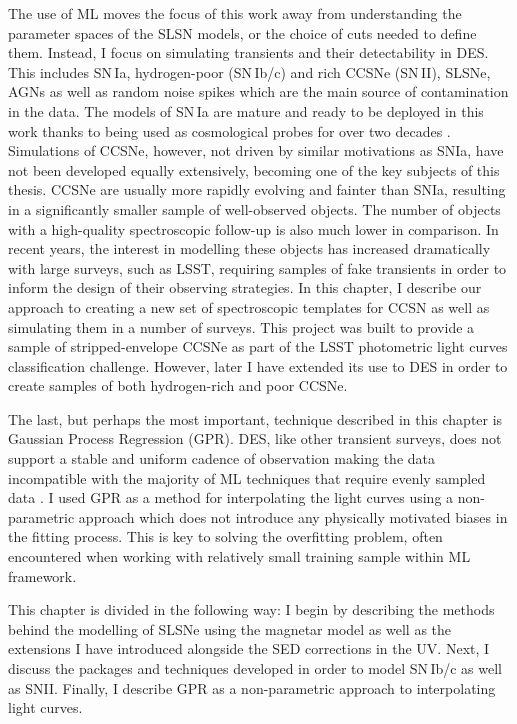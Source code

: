 The use of ML moves the focus of this work away from understanding the parameter spaces of the SLSN models, or the choice of cuts needed to define them. Instead, I focus on simulating transients and their detectability in DES. This includes SN\,Ia, hydrogen-poor (SN\,Ib/c) and rich CCSNe (SN\,II), SLSNe, AGNs as well as random noise spikes which are the main source of contamination in the data. The models of SN\,Ia are mature and ready to be deployed in this work \citep{Kessler2009,Kessler2015} thanks to being used as cosmological probes for over two decades \citep{Riess1998,Perlmutter1999}. Simulations of CCSNe, however, not driven by similar motivations as SNIa, have not been developed equally extensively, becoming one of the key subjects of this thesis. CCSNe are usually more rapidly evolving and fainter than SNIa, resulting in a significantly smaller sample of well-observed objects. The number of objects with a high-quality spectroscopic follow-up is also much lower in comparison. In recent years, the interest in modelling these objects has increased dramatically with large surveys, such as LSST, requiring samples of fake transients in order to inform the design of their observing strategies. In this chapter, I describe our approach to creating a new set of spectroscopic templates for CCSN as well as simulating them in a number of surveys. This project was built to provide a sample of stripped-envelope CCSNe as part of the LSST photometric light curves classification challenge. However, later I have extended its use to DES in order to create samples of both hydrogen-rich and poor CCSNe.

The last, but perhaps the most important, technique described in this chapter is Gaussian Process Regression (GPR). DES, like other transient surveys, does not support a stable and uniform cadence of observation making the data incompatible with the majority of ML techniques that require evenly sampled data \citep{Lochner2016}. I used GPR as a method for interpolating the light curves using a non-parametric approach which does not introduce any physically motivated biases in the fitting process. This is key to solving the overfitting problem, often encountered when working with relatively small training sample within ML framework.

This chapter is divided in the following way: I begin by describing the methods behind the modelling of SLSNe using the magnetar model as well as the extensions I have introduced alongside the SED corrections in the UV. Next, I discuss the packages and techniques developed in order to model SN\,Ib/c as well as SNII. Finally, I describe GPR as a non-parametric approach to interpolating light curves.

